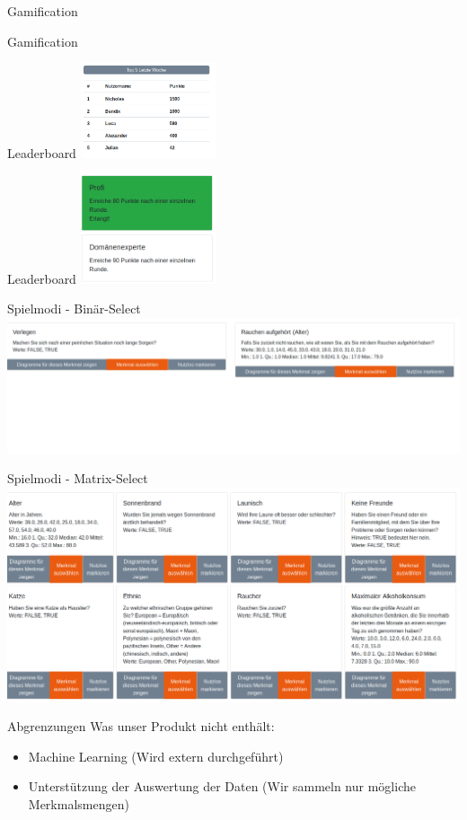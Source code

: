 \documentclass[xcolor=dvipsnames]{beamer}
\begin{document}
\begin{frame}{Gamification}
    \end{frame}
    \begin{frame}{Gamification}
        \begin{block}{Leaderboard}
        \center
        \includegraphics[width=0.3\textwidth]{img/leaderboard.png}
        \end{block}
        \begin{block}{Leaderboard}
        \center
        \includegraphics[width=0.3\textwidth]{img/achievment.png}
        \end{block}
    \end{frame}
   \begin{frame}{Spielmodi - Binär-Select}
        \includegraphics[width=\textwidth]{img/binary_select.png}
    \end{frame}
    \begin{frame}{Spielmodi - Matrix-Select}
        \includegraphics[width=\textwidth]{img/matrix_select.png}
    \end{frame}
    \begin{frame}{Abgrenzungen}
        Was unser Produkt nicht enthält:
        \begin{itemize}
            \item Machine Learning (Wird extern durchgeführt)
            \item Unterstützung der Auswertung der Daten (Wir sammeln nur mögliche Merkmalsmengen)
        \end{itemize}
    \end{frame}
 
\end{document}
